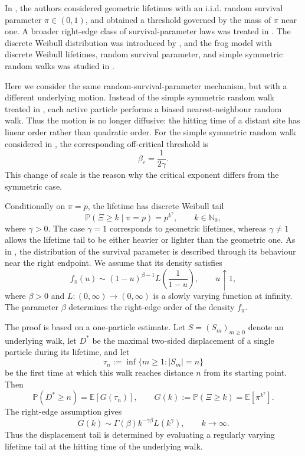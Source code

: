 \documentclass[reqno,final,11pt]{amsart}
\newcommand{\Nzero}{\mathbb N_0}
\newcommand{\E}{\mathbb E}
\newcommand{\Pbb}{\mathbb P}
\theoremstyle{plain}
\theoremstyle{definition}
\theoremstyle{remark}
\numberwithin{equation}{section}
\begin{document}
In \cite{CarvalhoMachado}, the authors considered geometric lifetimes with an
i.i.d. random survival parameter \(\pi\in(0,1)\), and obtained a threshold governed
by the mass of \(\pi\) near one. A broader right-edge class of survival-parameter
laws was treated in \cite{CMRGeneral}. The discrete Weibull distribution was introduced by \cite{NakagawaOsaki1975}, and the frog model with discrete Weibull lifetimes, random survival parameter, and simple symmetric random walks was studied in \cite{CMRWeibull}.

Here we consider the same random-survival-parameter mechanism, but with a different underlying motion. Instead of the simple symmetric random walk treated in \cite{CMRWeibull}, each active particle performs a biased nearest-neighbour random walk. Thus the motion is no longer diffusive: the hitting time of a distant site has linear order rather than quadratic order. For the simple symmetric random walk considered in \cite{CMRWeibull}, the corresponding off-critical threshold is \[ \beta_c=\frac{1}{2\gamma}. \] This change of scale is the reason why the critical exponent differs from the symmetric case.

Conditionally on \(\pi=p\), the lifetime has discrete Weibull tail
\[
  \Pbb(\Xi\ge k\mid \pi=p)=p^{k^\gamma},
  \qquad k\in\Nzero,
\]
where \(\gamma>0\). The case \(\gamma=1\) corresponds to geometric lifetimes,
whereas \(\gamma\ne1\) allows the lifetime tail to be either heavier or lighter
than the geometric one. As in \cite{CMRGeneral,CMRWeibull}, the distribution of
the survival parameter is described through its behaviour near the right
endpoint. We assume that its density satisfies
\[
  f_\pi(u)\sim (1-u)^{\beta-1}
  L\left(\frac1{1-u}\right),
  \qquad u\uparrow1,
\]
where \(\beta>0\) and \(L:(0,\infty)\to(0,\infty)\) is a slowly varying function at infinity. The parameter \(\beta\) determines the right-edge order of the density \(f_\pi\).


The proof is based on a one-particle estimate. Let \(S=(S_m)_{m\ge0}\) denote
an underlying walk, let \(D^*\) be the maximal two-sided displacement of a
single particle during its lifetime, and let
\[
  \tau_n:=\inf\{m\ge1: |S_m|=n\}
\]
be the first time at which this walk reaches distance \(n\) from its starting
point. Then
\[
  \Pbb(D^*\ge n)=\E[G(\tau_n)],
  \qquad
  G(k):=\Pbb(\Xi\ge k)=\E[\pi^{k^\gamma}].
\]
The right-edge assumption gives
\[
  G(k)\sim
  \Gamma(\beta)k^{-\gamma\beta}L(k^\gamma),
  \qquad k\to\infty.
\]
Thus the displacement tail is determined by evaluating a regularly varying
lifetime tail at the hitting time of the underlying walk.
\end{document}
